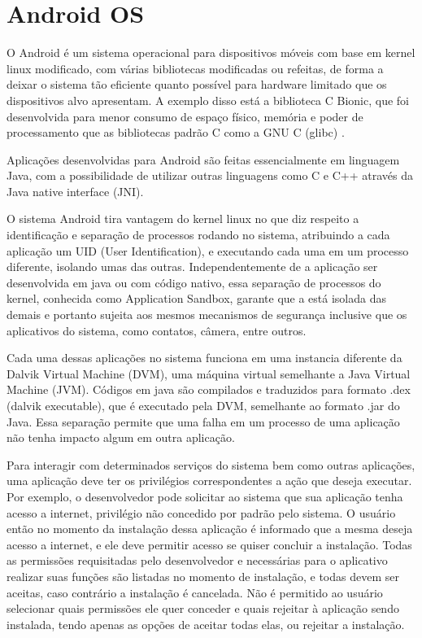 \chapter{Android OS}
\label{cap:android-os}

O Android é um sistema operacional para dispositivos móveis com base em kernel linux modificado, com várias bibliotecas modificadas ou refeitas, de forma a deixar o sistema tão eficiente quanto possível para hardware limitado que os dispositivos alvo apresentam. A exemplo disso está a biblioteca C Bionic, que foi desenvolvida para menor consumo de espaço físico, memória e poder de processamento que as bibliotecas padrão C como a GNU C (glibc) \cite{devos2014}. 

Aplicações desenvolvidas para Android são feitas essencialmente em linguagem Java, com a possibilidade de utilizar outras linguagens como C e C++ através da Java native interface (JNI). 

O sistema Android tira vantagem do kernel linux no que diz respeito a identificação e separação de processos rodando no sistema, atribuindo a cada aplicação um UID (User Identification), e executando cada uma em um processo diferente, isolando umas das outras.  Independentemente de a aplicação ser desenvolvida em java ou com código nativo, essa separação de processos do kernel, conhecida como Application Sandbox, garante que a está isolada das demais e portanto sujeita aos mesmos mecanismos de segurança inclusive que os aplicativos do sistema, como contatos, câmera, entre outros. 

Cada uma dessas aplicações no sistema funciona em uma instancia diferente da Dalvik Virtual Machine (DVM), uma máquina virtual semelhante a Java Virtual Machine (JVM). Códigos em java são compilados e traduzidos para formato .dex (dalvik executable), que é executado pela DVM, semelhante ao formato .jar do Java. Essa separação permite que uma falha em um processo de uma aplicação não tenha impacto algum em outra aplicação. 

Para interagir com determinados serviços do sistema bem como outras aplicações, uma aplicação deve ter os privilégios correspondentes a ação que deseja executar. Por exemplo, o desenvolvedor pode solicitar ao sistema que sua aplicação tenha acesso a internet, privilégio não concedido por padrão pelo sistema. O usuário então no momento da instalação dessa aplicação é informado que a mesma deseja acesso a internet, e ele deve permitir acesso se quiser concluir a instalação. Todas as permissões requisitadas pelo desenvolvedor e necessárias para o aplicativo realizar suas funções são listadas no momento de instalação, e todas devem ser aceitas, caso contrário a instalação é cancelada. Não é permitido ao usuário selecionar quais permissões ele quer conceder e quais rejeitar à aplicação sendo instalada, tendo apenas as opções de aceitar todas elas, ou rejeitar a instalação. 

